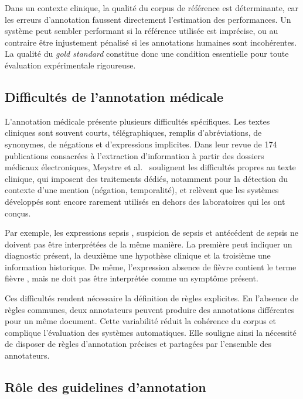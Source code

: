 Dans un contexte clinique, la qualité du corpus de référence est déterminante, car les erreurs d'annotation faussent directement l'estimation des performances. Un système peut sembler performant si la référence utilisée est imprécise, ou au contraire être injustement pénalisé si les annotations humaines sont incohérentes. La qualité du \textit{gold standard} constitue donc une condition essentielle pour toute évaluation expérimentale rigoureuse.

\subsection{Difficultés de l'annotation médicale}

L'annotation médicale présente plusieurs difficultés spécifiques. Les textes cliniques sont souvent courts, télégraphiques, remplis d'abréviations, de synonymes, de négations et d'expressions implicites. Dans leur revue de 174 publications consacrées à l'extraction d'information à partir des dossiers médicaux électroniques, Meystre et al.~\cite{meystre2008extracting} soulignent les difficultés propres au texte clinique, qui imposent des traitements dédiés, notamment pour la détection du contexte d'une mention (négation, temporalité), et relèvent que les systèmes développés sont encore rarement utilisés en dehors des laboratoires qui les ont conçus.

Par exemple, les expressions \og sepsis \fg{}, \og suspicion de sepsis \fg{} et \og antécédent de sepsis \fg{} ne doivent pas être interprétées de la même manière. La première peut indiquer un diagnostic présent, la deuxième une hypothèse clinique et la troisième une information historique. De même, l'expression \og absence de fièvre \fg{} contient le terme \og fièvre \fg{}, mais ne doit pas être interprétée comme un symptôme présent.

Ces difficultés rendent nécessaire la définition de règles explicites. En l'absence de règles communes, deux annotateurs peuvent produire des annotations différentes pour un même document. Cette variabilité réduit la cohérence du corpus et complique l'évaluation des systèmes automatiques. Elle souligne ainsi la nécessité de disposer de règles d'annotation précises et partagées par l'ensemble des annotateurs.

\subsection{Rôle des guidelines d'annotation}

